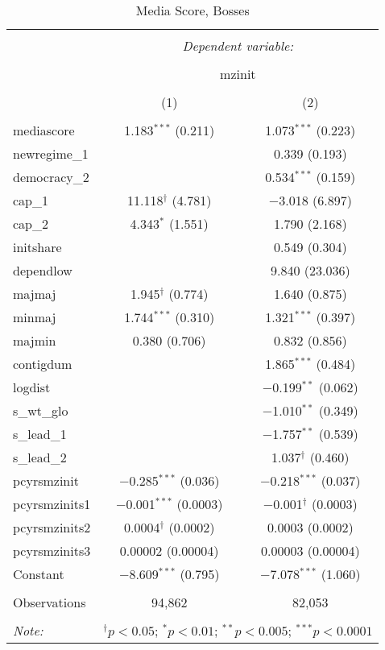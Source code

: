
\begin{table}[!htbp] \centering 
  \caption{Media Score, Bosses} 
  \label{} 
\begin{tabular}{@{\extracolsep{5pt}}lcc} 
\\[-1.8ex]\hline 
\hline \\[-1.8ex] 
 & \multicolumn{2}{c}{\textit{Dependent variable:}} \\ 
\cline{2-3} 
\\[-1.8ex] & \multicolumn{2}{c}{mzinit} \\ 
\\[-1.8ex] & (1) & (2)\\ 
\hline \\[-1.8ex] 
 mediascore & 1.183$^{***}$ (0.211) & 1.073$^{***}$ (0.223) \\ 
  newregime\_1 &  & 0.339 (0.193) \\ 
  democracy\_2 &  & 0.534$^{***}$ (0.159) \\ 
  cap\_1 & 11.118$^{\dagger}$ (4.781) & $-$3.018 (6.897) \\ 
  cap\_2 & 4.343$^{*}$ (1.551) & 1.790 (2.168) \\ 
  initshare &  & 0.549 (0.304) \\ 
  dependlow &  & 9.840 (23.036) \\ 
  majmaj & 1.945$^{\dagger}$ (0.774) & 1.640 (0.875) \\ 
  minmaj & 1.744$^{***}$ (0.310) & 1.321$^{***}$ (0.397) \\ 
  majmin & 0.380 (0.706) & 0.832 (0.856) \\ 
  contigdum &  & 1.865$^{***}$ (0.484) \\ 
  logdist &  & $-$0.199$^{**}$ (0.062) \\ 
  s\_wt\_glo &  & $-$1.010$^{**}$ (0.349) \\ 
  s\_lead\_1 &  & $-$1.757$^{**}$ (0.539) \\ 
  s\_lead\_2 &  & 1.037$^{\dagger}$ (0.460) \\ 
  pcyrsmzinit & $-$0.285$^{***}$ (0.036) & $-$0.218$^{***}$ (0.037) \\ 
  pcyrsmzinits1 & $-$0.001$^{***}$ (0.0003) & $-$0.001$^{\dagger}$ (0.0003) \\ 
  pcyrsmzinits2 & 0.0004$^{\dagger}$ (0.0002) & 0.0003 (0.0002) \\ 
  pcyrsmzinits3 & 0.00002 (0.00004) & 0.00003 (0.00004) \\ 
  Constant & $-$8.609$^{***}$ (0.795) & $-$7.078$^{***}$ (1.060) \\ 
 \hline \\[-1.8ex] 
Observations & 94,862 & 82,053 \\ 
\hline 
\hline \\[-1.8ex] 
\textit{Note:}  & \multicolumn{2}{r}{$^{\dagger} p<0.05$; $^{*} p<0.01$; $^{**} p<0.005$; $^{***} p<0.0001$} \\ 
\end{tabular} 
\end{table} 
